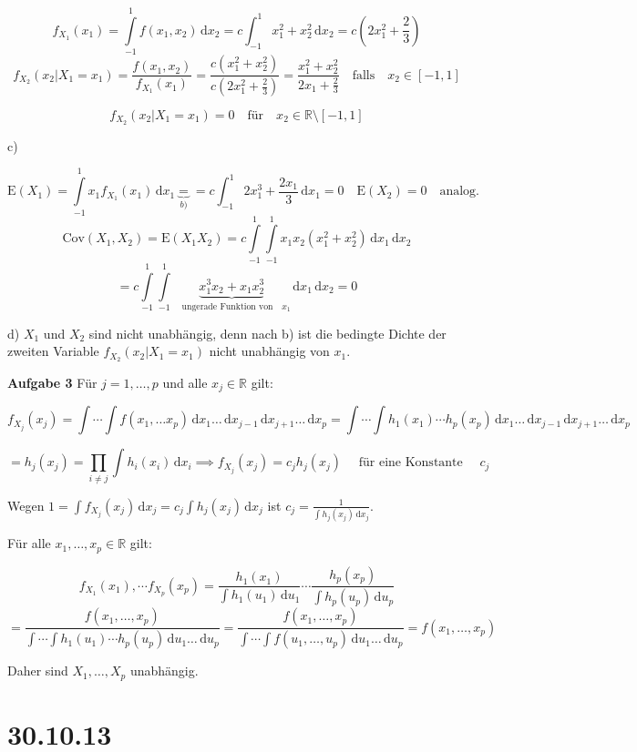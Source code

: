 \documentclass[12pt, a4paper]{article}
\newcommand{\E}{\mbox{I\negthinspace E}}
\theoremstyle{empty}
\newcommand{\R}{\mathbb{R}}
\newcommand{\1}{\mathds{1}}
\renewcommand{\E}{\mathrm{E}}
\newcommand{\Cov}{\mathrm{Cov}}
\renewcommand{\d}{\,\mathrm{d}}
\providecommand{\mtext}[1]{\quad \text{#1} \quad}
\begin{document}
\[   f_{X_1}(x_1) = \int\limits_{-1}^1 f(x_1, x_2) \d x_2  = c \int_{-1}^1 x_1^2 + x_2^2 \d x_2 = c(2x_1^2 + \frac{2}{3})  \]
\[   f_{X_2}(x_2 | X_1 = x_1) = \frac{f(x_1, x_2)}{f_{X_1} (x_1) } = \frac{c(x_1^2 + x_2^2 ) }{c(2x_1^2 + \frac{2}{3})}  = \frac{x_1^2 + x_2^2}{2x_1 + \frac{2}{3}} \mtext{falls} x_2 \in [-1, 1]  \]

\[   f_{X_2}(x_2|X_1 = x_1) = 0 \mtext{für} x_2 \in \R \setminus [-1, 1]    \]

c)

\[  \E(X_1) = \int\limits_{-1}^1 x_1 f_{X_1}(x_1)\d x_1 \underbrace{=}_{b)} = c\int_{-1}^1 2x_1^3 + \frac{2x_1}{3} \d x_1  = 0 \quad \E(X_2) = 0 \mtext{analog.}    \]
\[   \Cov(X_1, X_2) = \E(X_1 X_2) = c \int\limits_{-1}^1 \int\limits_{-1}^1  x_1 x_2 (x_1^2 + x_2^2) \d x_1 \d x_2   \]
\[   = c \int\limits_{-1}^1 \int\limits_{-1}^1 \underbrace{x_1^3 x_2 + x_1 x_2^3}_{\mtext{ungerade Funktion von} x_1} \d x_1 \d x_2  = 0  \]

d) $X_1$ und $X_2$ sind nicht unabhängig, denn nach b) ist die bedingte Dichte der zweiten Variable $f_{X_2}(x_2 | X_1 = x_1)$ nicht unabhängig von $x_1$.


\textbf{Aufgabe 3}
Für $j = 1, \ldots, p$ und alle $x_j \in \R$ gilt:

\[  f_{X_j} (x_j) = \int \cdots \int f (x_1, \ldots x_p) \d x_1 \ldots \d x_{j-1} \d x_{j+1} \ldots \d x_p = \int \cdots \int h_1 (x_1) \cdots h_p (x_p )  \d x_1 \ldots \d x_{j-1} \d x_{j+1} \ldots \d x_p   \]

\[  = h_j (x_j) = \prod_{i \neq j} \int h_i (x_i) \d x_i \implies   f_{X_j}(x_j) = c_j h_j (x_j) \mtext{ für eine Konstante } c_j   \]

Wegen $1 = \int f_{X_j} (x_j) \d x_j = c_j \int h_j (x_j) \d x_j$ ist $ c_j = \frac{1}{\int h_j (x_j) \d x_j}$.

Für alle $x_1, \ldots, x_p \in \R$ gilt:

\[ f_{X_1} (x_1), \cdots f_{X_p} (x_p) = \frac{ h_1 (x_1)}{\int h_1 (u_1) \d u_1} \cdots   \frac{ h_p (x_p)}{\int h_p (u_p) \d u_p}       \]
\[  = \frac{f(x_1, \ldots, x_p)}{\int \cdots \int h_1 (u_1) \cdots h_p (u_p) \d u_1 \ldots \d u_p }  =   \frac{f(x_1, \ldots, x_p)}{\int \cdots \int f(u_1, \ldots, u_p) \d u_1 \ldots \d u_p }  = f(x_1, \ldots, x_p )  \]

Daher sind $X_1, \ldots, X_p$ unabhängig.

\section{30.10.13}
\end{document}
